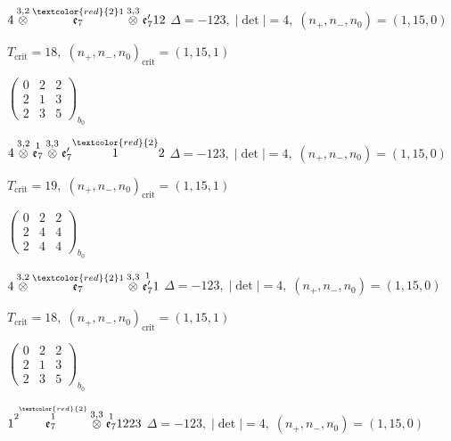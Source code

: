 \documentclass[10pt]{article}
\begin{document}
$4\overset{3,2}{\otimes}\overset{\textcolor{red}{2}1}{\mathfrak{e}_7}\overset{3,3}{\otimes}\mathfrak{e}_7'12$ \quad $\Delta=-123,\; |\det|=4,\; (n_+,n_-,n_0)=(1,15,0)$

\hspace{1em}$T_{\text{crit}}=18,\; (n_+,n_-,n_0)_{\text{crit}}=(1,15,1)$

\hspace{2em}$\left(\begin{smallmatrix}0 & 2 & 2 \\ 2 & 1 & 3 \\ 2 & 3 & 5\end{smallmatrix}\right)_{\!b_0}$

$4\overset{3,2}{\otimes}\overset{1}{\mathfrak{e}_7}\overset{3,3}{\otimes}\mathfrak{e}_7'\overset{\textcolor{red}{2}}{1}2$ \quad $\Delta=-123,\; |\det|=4,\; (n_+,n_-,n_0)=(1,15,0)$

\hspace{1em}$T_{\text{crit}}=19,\; (n_+,n_-,n_0)_{\text{crit}}=(1,15,1)$

\hspace{2em}$\left(\begin{smallmatrix}0 & 2 & 2 \\ 2 & 4 & 4 \\ 2 & 4 & 4\end{smallmatrix}\right)_{\!b_0}$

\smallskip

$4\overset{3,2}{\otimes}\overset{\textcolor{red}{2}1}{\mathfrak{e}_7}\overset{3,3}{\otimes}\overset{1}{\mathfrak{e}_7'}1$ \quad $\Delta=-123,\; |\det|=4,\; (n_+,n_-,n_0)=(1,15,0)$

\hspace{1em}$T_{\text{crit}}=18,\; (n_+,n_-,n_0)_{\text{crit}}=(1,15,1)$

\hspace{2em}$\left(\begin{smallmatrix}0 & 2 & 2 \\ 2 & 1 & 3 \\ 2 & 3 & 5\end{smallmatrix}\right)_{\!b_0}$

\smallskip

$1\overset{2\overset{\textcolor{red}{2}}{1}}{\mathfrak{e}_7}\overset{3,3}{\otimes}\overset{1}{\mathfrak{e}_7}1223$ \quad $\Delta=-123,\; |\det|=4,\; (n_+,n_-,n_0)=(1,15,0)$
\end{document}
